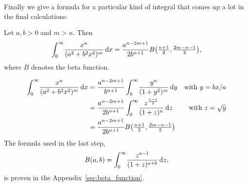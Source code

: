 Finally we give a formula for a particular kind of integral that comes up a lot
in the final calculations:
\begin{Lemma}
  \label{lem:beta_function_formula}
  Let $a, b > 0$ and $m > n$. Then
  \begin{align*}
    \Integ[\infty]{0}{x}{\frac{x^n}{(a^2 + b^2 x^2)^{m}}} =
    \frac{a^{n-2m+1}}{2b^{n+1}}B\bigl(\tfrac{n+1}{2}, \tfrac{2m - n -
    1}{2}\bigr),
  \end{align*}
  where $B$ denotes the beta function.
  \begin{Proof}
    \begin{align*}
      \Integ[\infty]{0}{x}{\frac{x^n}{(a^2 + b^2 x^2)^{m}}} 
      &= \frac{a^{n-2m+1}}{b^{n+1}} \Integ[\infty]{0}{y}{\frac{y^n}{(1 +
  y^2)^m}}
        &\text{with $y = bx / a$} \\
        &= \frac{a^{n - 2m + 1}}{2b^{n+1}}
        \Integ[\infty]{0}{z}{\frac{z^{\frac{n-1}{2}}}{(1 + z)^n}}
        &\text{with $z = \sqrt{y}$}\\
        &= \frac{a^{n-2m+1}}{2b^{n+1}}B\bigl(\tfrac{n+1}{2}, \tfrac{2m - n -
      1}{2}\bigr)
    \end{align*}
    The formula used in the last step,
    \begin{align*}
      B(a,b) = \Integ[\infty]{0}{z}{\frac{z^{a-1}}{(1+z)^{a+b}}},
    \end{align*}
    is proven in the Appendix~\ref{sec:beta_function}.
  \end{Proof}
\end{Lemma}
